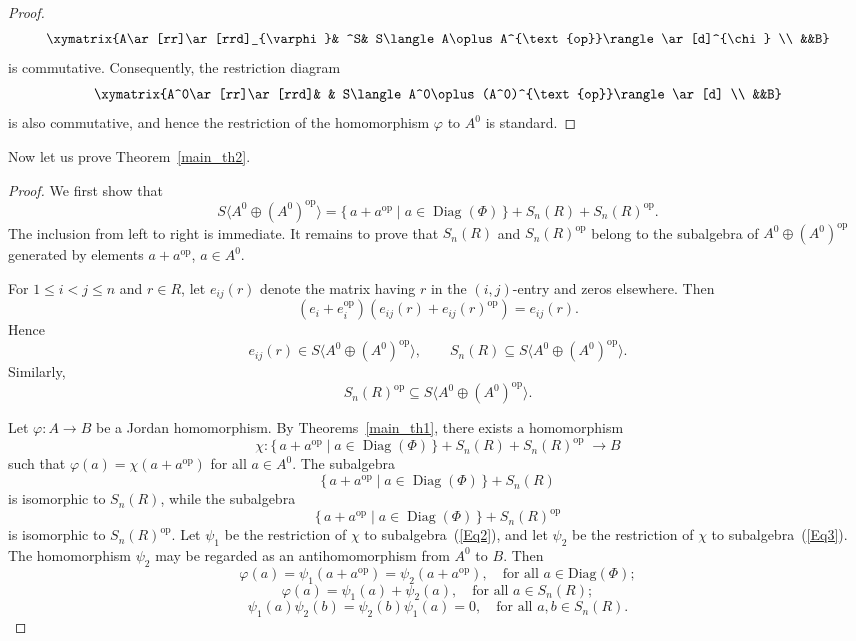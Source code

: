 \documentclass[12pt]{amsart}
\begin{document}
{\begin{proof}
	$$
	\xymatrix{A\ar[rr]\ar[rrd]_{\varphi}& ^S&
		S\langle   A\oplus A^{\text{op}}\rangle \ar[d]^{\chi}
		\\ &&B} $$
	is commutative. Consequently, the restriction diagram
		$$
	\xymatrix{A^0\ar[rr]\ar[rrd]& &
		S\langle   A^0\oplus (A^0)^{\text{op}}\rangle \ar[d]
		\\ &&B} $$
	is  also commutative, and hence  the restriction of	the homomorphism $\varphi$ to $A^0$ is standard.	
\end{proof}

Now let us prove Theorem~\ref{main_th2}.
\begin{proof}	We first show that
	\begin{equation}\label{Eq1}
S\langle   A^0\oplus (A^0)^{\text{op}}\rangle  
	= \{\, a + a^{\text{op}}  \mid a \in \operatorname{Diag}(\Phi) \, \}
	+ S_n(R) + S_n(R)^{\text{op}} .
		\end{equation}	The inclusion from left to right is immediate.  
	It remains to prove that $S_n(R)$ and $S_n(R)^{\text{op}}$ belong to the subalgebra of $A^0\oplus (A^0)^{\text{op}}$
	generated by elements $a + a^{\text{op}}$, $a \in A^0$.
	
	For $1 \leq i < j \leq n$ and $r \in R$, let $e_{ij}(r)$ denote the matrix
	having $r$ in the $(i,j)$-entry and zeros elsewhere. Then
	\[
	(e_i + e_i^{\text{op}})(e_{ij}(r) + e_{ij}(r)^{\text{op}}) = e_{ij}(r).
	\] Hence 	\[ e_{ij}(r) \in S\langle   A^0\oplus (A^0)^{\text{op}}\rangle  , \qquad
	S_n(R) \subseteq S\langle   A^0\oplus (A^0)^{\text{op}}\rangle.
	\] Similarly, 	\[ 
	S_n(R)^{\text{op}} \subseteq S\langle   A^0\oplus (A^0)^{\text{op}}\rangle.
	\] 
	
	Let $\varphi : A \to B$ be a Jordan homomorphism.  
	By Theorems~\ref{main_th1}, there exists a homomorphism
	\[
	\chi : \{\, a + a^{\text{op}} \mid 
	a \in \operatorname{Diag}(\Phi) \,\}  + S_n(R) + S_n(R)^{\text{op}}
	\;\longrightarrow B
	\]
	such that $\varphi(a) = \chi(a + a^{\text{op}} )$ for all $a \in A^0$.	The subalgebra
	\begin{equation}\label{Eq2}
	\{\, a +a^{\text{op}}  \mid a \in \operatorname{Diag}(\Phi) \,\} + S_n(R)
		\end{equation}
	is isomorphic to $S_n(R)$, while the subalgebra
	\begin{equation}\label{Eq3}
	\{\, a + a^{\text{op}}  \mid a \in \operatorname{Diag}(\Phi) \,\} + S_n(R)^{\text{op}}
		\end{equation}
	is isomorphic to $S_n(R)^{\text{op}}$.  	Let $\psi_1$ be the restriction of $\chi$ to  subalgebra~(\ref{Eq2}),	and let $\psi_2$ be the restriction of $\chi$ to  subalgebra~(\ref{Eq3}). The homomorphism $\psi_2$ may be regarded as an antihomomorphism from $A^0$ to $B$.  Then 
\[
\varphi(a) =\psi_1(a+a^{\text{op}} ) =\psi_2(a+a^{\text{op}} ), \quad \text{for all }  a \in \mathrm{Diag}(\Phi);
\]
\[
\varphi(a) = \psi_1(a) +\psi_2(a), \quad \text{for all } a \in S_n(R);
\]
\[
\psi_1(a)\psi_2(b) =\psi_2(b)\psi_1(a) = 0, \quad \text{for all  } a, b \in S_n(R).
\]



\end{proof}}
\end{document}

